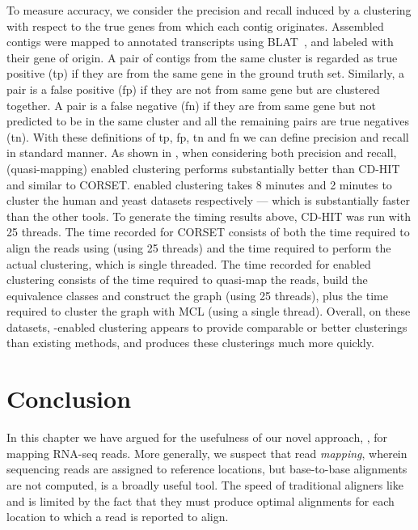 To measure accuracy, we consider the precision and recall induced by a clustering with respect to the true genes from which each contig originates.  Assembled contigs were mapped to annotated transcripts using BLAT~\citep{kent2002blat}, and labeled with their gene of origin. A pair of contigs from the same cluster is regarded as true positive (tp) if they are from the same gene in the ground truth set. Similarly, a pair is a false positive (fp) if they are not from same gene but are clustered together.  A pair is a false negative (fn) if they are from same gene but not predicted to be in the same cluster and all the remaining pairs are true negatives (tn). With these definitions of tp, fp, tn and fn we can define precision and recall in standard manner. As shown in , when considering both precision and recall, \rapmap (quasi-mapping) enabled clustering performs substantially better than CD-HIT and similar to CORSET. \rapmap enabled clustering takes 8 minutes and 2 minutes to cluster the human and yeast datasets respectively --- which is substantially faster than the other tools. To generate the timing results above, CD-HIT was run with 25 threads. The time recorded for CORSET consists of both the time required to align the reads using \bt (using 25 threads) and the time required to perform the actual clustering, which is single threaded.  The time recorded for \rapmap enabled clustering consists of the time required to quasi-map the reads, build the equivalence classes and construct the graph (using 25 threads), plus the time required to cluster the graph with MCL (using a single thread). Overall, on these datasets, \rapmap-enabled clustering appears to provide comparable or better clusterings than existing methods, and produces these clusterings much more quickly.


\section{Conclusion}
In this chapter we have argued for the usefulness of our novel approach, \qm, for mapping RNA-seq reads.  More generally, we suspect that read \textit{mapping}, wherein sequencing reads are assigned to reference locations, but base-to-base alignments are not computed, is a broadly useful tool.  The speed of traditional aligners like \bt and \STAR is limited by the fact that they must produce optimal alignments for each location to which a read is reported to align.

